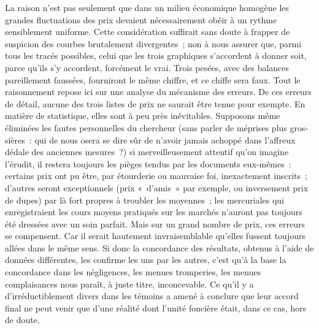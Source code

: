 \documentclass[french,twoside]{book} %
\newcommand{\astermono}{\medskip\centerline{\color{rubric}\large\selectfont{\syms ✻}}\medskip\par}%
\begin{document}
La raison n’est pas seulement que dans un milieu économique homogène les grandes fluctuations des prix devaient nécessairement obéir à un rythme sensiblement uniforme. Cette considération suffirait sans doute à frapper de suspicion des courbes brutalement divergentes ; non à nous assurer que, parmi tous les tracés possibles, celui que les trois graphiques s’accordent à donner soit, parce qu’ils s’y accordent, forcément le vrai. Trois pesées, avec des balances pareillement faussées, fourniront le même chiffre, et ce chiffe sera faux. Tout le raisonnement repose ici sur une analyse du mécanisme des erreurs. De ces erreurs de détail, aucune des trois listes de prix ne saurait être tenue pour exempte. En matière de statistique, elles sont à peu près inévitables. Supposons même éliminées les fautes personnelles du chercheur (sans parler de méprises plus gros­sières : qui de nous osera se dire sûr de n’avoir jamais achoppé dans l’affreux dédale des anciennes mesures ?) si merveilleusement attentif qu’on imagine l’érudit, il restera toujours les pièges tendus par les documents eux-mêmes : certains prix ont pu être, par étourderie ou mauvaise foi, inexactement inscrits ; d’autres seront exceptionnels (prix « d’amis » par exemple, ou inversement prix de dupes) par là fort propres à troubler les moyennes ; les mercuriales qui enregistraient les cours moyens pra­tiqués sur les marchés n’auront pas toujours été dressées avec un soin parfait. Mais sur un grand nombre de prix, ces erreurs se compensent. Car il serait hautement invraisemblable qu’elles fussent toujours allées dans le même sens. Si donc la concordance des résultats, obtenus à l’aide de données différentes, les confirme les uns par les autres, c’est qu’à la base la concordance dans les négligences, les menues tromperies, les menues complaisances nous paraît, à juste titre, inconcevable. Ce qu’il y a d’irréductiblement divers dans les témoins a amené à conclure que leur accord final ne peut venir que d’une réalité dont l’unité foncière était, dans ce cas, hors de doute.\par

\astermono
\end{document}
